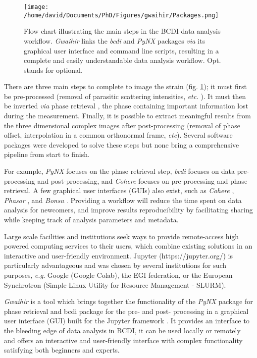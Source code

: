 \begin{figure}[!htb]
    \texttt{[image: /home/david/Documents/PhD/Figures/gwaihir/Packages.png]}
    \caption{Flow chart illustrating the main steps in the BCDI data analysis workflow. \textit{Gwaihir} links the \textit{bcdi} and \textit{PyNX} packages \textit{via} its graphical user interface and command line scripts, resulting in a complete and easily understandable data analysis workflow. Opt. stands for optional.
    }
    \label{fig:Packages}
\end{figure}

There are three main steps to complete to image the strain (fig. \ref{fig:Packages}); it must first be pre-processed (removal of parasitic scattering intensities, \textit{etc.} \parencite{ozturk_performance_2017}).
It must then be inverted \textit{via} phase retrieval \parencite{miao_possible_2000}, the phase containing important information lost during the measurement.
Finally, it is possible to extract meaningful results from the three dimensional complex images after post-processing (removal of phase offset, interpolation in a common orthonormal frame, \textit{etc}).
Several software packages were developed to solve these steps but none bring a comprehensive pipeline from start to finish.

For example, \textit{PyNX} \parencite{pynx2020operators} focuses on the phase retrieval step, \textit{bcdi} \parencite{jerome_carnis_2021_5741935} focuses on data pre-processing and post-processing, and \textit{Cohere} \parencite{cohere_2021} focuses on pre-processing and phase retrieval.
A few graphical user interfaces (GUIs) also exist, such as \textit{Cohere} \parencite{cohere_2021}, \textit{Phasor} \parencite{dzhigaev_dzhigaevdphasor_2021}, and \textit{Bonsu} \parencite{newton_bonsu_2012}.
Providing a workflow will reduce the time spent on data analysis for newcomers, and improve results reproducibility by facilitating sharing while keeping track of analysis parameters and metadata.

Large scale facilities and institutions seek ways to provide remote-access high powered computing services to their users, which combine existing solutions in an interactive and user-friendly environment.
Jupyter (https://jupyter.org/) is particularly advantageous and was chosen by several institutions for such purposes, \textit{e.g}. Google (Google Colab), the EGI federation, or the European Synchrotron (Simple Linux Utility for Resource Management - SLURM).

\textit{Gwaihir} is a tool which brings together the functionality of the \textit{PyNX} package for phase retrieval and bcdi package for the pre- and post- processing in a graphical user interface (GUI) built for the Jupyter framework \parencite{Kluyver2016jupyter}.
It provides an interface to the bleeding edge of data analysis in BCDI, it can be used locally or remotely and offers an interactive and user-friendly interface with complex functionality satisfying both beginners and experts.

